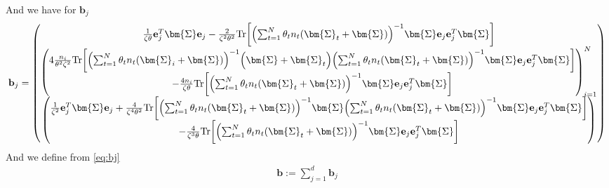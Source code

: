 \documentclass[final]{l4dc2026}
\newcommand{\bSigma}{\bm{\Sigma}}
\newcommand{\bb}{\mathbf{b}}
\newcommand{\be}{\mathbf{e}}
\newcommand{\bh}{\mathbf{h}}
\newcommand{\tr}{\text{Tr}}
\begin{document}
And we have for $\bb_j$
\begin{equation} \label{eq:bj}
    \bb_j = \begin{pmatrix}
        \frac{1}{\zeta \theta} \be_j^T \bSigma \be_j - \frac{2}{\zeta^2 \theta^2} \tr \biggl[ \Bigl(\sum_{t=1}^N \theta_t n_t (\bSigma_t + \bSigma) \Bigr)^{-1}\bSigma \be_j \be_j^T \bSigma \biggr]\\
        \begin{pmatrix}
            4 \frac{n_i}{\theta^2\zeta^2}  \tr \biggl[ \Bigl(\sum_{t=1}^N \theta_t n_t (\bSigma_i + \bSigma) \Bigr)^{-1} \Bigl(\bSigma + \bSigma_t \Bigr)  \Bigl(\sum_{t=1}^N \theta_t n_t (\bSigma_t + \bSigma)\Bigr)^{-1} \bSigma \be_j \be_j^T \bSigma \biggr] \\ 
            - \frac{4  n_i }{\zeta \theta} \tr\biggl[\Bigl(\sum_{t=1}^N \theta_t n_t (\bSigma_t + \bSigma) \Bigr)^{-1}  \bSigma \be_j \be_j^T \bSigma\biggr]
        \end{pmatrix}_{i=1}^N \\
        \begin{pmatrix}
            \frac{1}{\zeta^2} \be_j^T \bSigma \be_j + \frac{4}{\zeta^4 \theta^2} \tr \biggl[\Bigl(\sum_{t=1}^N \theta_t n_t (\bSigma_t + \bSigma) \Bigr)^{-1} \bSigma \Bigl(\sum_{t=1}^N \theta_t n_t (\bSigma_t + \bSigma) \Bigr)^{-1}  \bSigma \be_j \be_j^T \bSigma\biggr] \\
            -  \frac{4}{\zeta^3 \theta} \tr\biggl[\Bigl(\sum_{t=1}^N \theta_t n_t (\bSigma_t + \bSigma) \Bigr)^{-1}  \bSigma \be_j \be_j^T \bSigma\biggr]
        \end{pmatrix}
    \end{pmatrix}
\end{equation}
And we define from \eqref{eq:bj}
\begin{align} \label{eq:b_def}
    \bb := \sum_{j=1}^d \bb_j 
\end{align}
\end{document}
